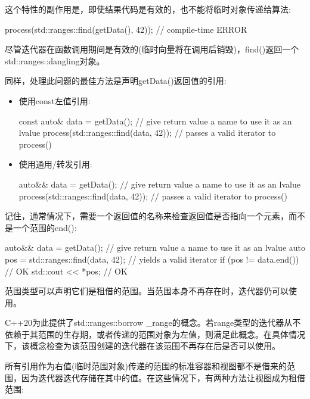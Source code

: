 这个特性的副作用是，即使结果代码是有效的，也不能将临时对象传递给算法:

\begin{cpp}
process(std::ranges::find(getData(), 42)); // compile-time ERROR
\end{cpp}

尽管迭代器在函数调用期间是有效的(临时向量将在调用后销毁)，find()返回一个std::ranges::dangling对象。

同样，处理此问题的最佳方法是声明getData()返回值的引用:

\begin{itemize}
\item
使用const左值引用:

\begin{cpp}
const auto& data = getData(); // give return value a name to use it as an lvalue
process(std::ranges::find(data, 42)); // passes a valid iterator to process()
\end{cpp}

\item
使用通用/转发引用:

\begin{cpp}
auto&& data = getData(); // give return value a name to use it as an lvalue
process(std::ranges::find(data, 42)); // passes a valid iterator to process()
\end{cpp}
\end{itemize}

记住，通常情况下，需要一个返回值的名称来检查返回值是否指向一个元素，而不是一个范围的end():

\begin{cpp}
auto&& data = getData(); // give return value a name to use it as an lvalue
auto pos = std::ranges::find(data, 42); // yields a valid iterator
if (pos != data.end()) { // OK
	std::cout << *pos; // OK
}
\end{cpp}


范围类型可以声明它们是租借的范围。当范围本身不再存在时，迭代器仍可以使用。

C++20为此提供了std::ranges::borrow \_range的概念。若range类型的迭代器从不依赖于其范围的生存期，或者传递的范围对象为左值，则满足此概念。在具体情况下，该概念检查为该范围创建的迭代器在该范围不再存在后是否可以使用。

所有引用作为右值(临时范围对象)传递的范围的标准容器和视图都不是借来的范围，因为迭代器迭代存储在其中的值。在这些情况下，有两种方法让视图成为租借范围:

